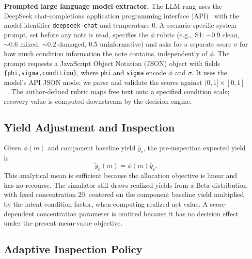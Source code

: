 \documentclass[a4paper,conference]{IEEEtran}
\begin{document}
\smallskip\noindent\textbf{Prompted large language model extractor.}
The LLM rung uses the DeepSeek chat-completions application programming interface
(API)~\cite{DeepSeekAPI} with the
model identifier \texttt{deepseek-chat} and temperature $0$. A scenario-specific system
prompt, set before any note is read, specifies the $\phi$ rubric (e.g.,\ S1:
${\sim}0.9$ clean, ${\sim}0.6$ mixed, ${\sim}0.2$ damaged, $0.5$ uninformative) and
asks for a separate score $\sigma$ for how much condition information the note
contains, independently of $\phi$. The prompt requests a JavaScript Object Notation (JSON)
object with fields \texttt{\{phi,sigma,condition\}}, where \texttt{phi} and
\texttt{sigma} encode $\phi$ and $\sigma$. It uses the model's API JSON mode; we
parse and validate the scores against $(0,1]\times[0,1]$~\cite{RLDBRepo}.
The author-defined rubric maps free text onto a specified condition scale; recovery
value is computed downstream by the decision engine.

\subsection{Yield Adjustment and Inspection}\label{sec:prior}

Given $\phi(m)$ and component baseline yield $\hat{y}_c$, the pre-inspection
expected yield is
\begin{equation}
  \tilde y_c(m)=\phi(m)\hat y_c.
  \label{eq:prior}
\end{equation}
This analytical mean is sufficient because the allocation objective is linear and
has no recourse. The simulator still draws realized yields from a Beta distribution
with fixed concentration 20, centered on the component baseline yield multiplied by
the latent condition factor, when computing realized net value. A score-dependent
concentration parameter is omitted because it has no decision effect under the
present mean-value objective.

\subsection{Adaptive Inspection Policy}
\end{document}
